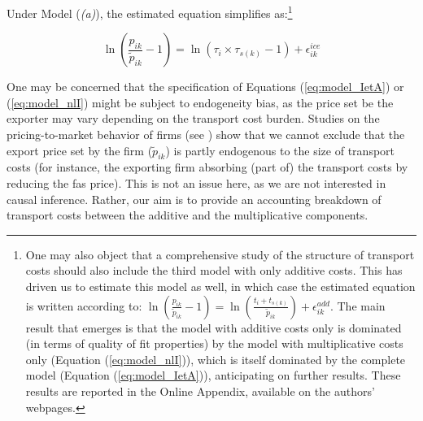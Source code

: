 \documentclass[a4paper,11pt]{article}
\begin{document}
Under Model (\textit{(a)}), the estimated equation simplifies as:\footnote{One may also object that a comprehensive study of the structure of transport costs should also include the third model with only additive costs. This has driven us to estimate this model as well, in which case the estimated equation is written according to: $\ln\left(\frac{p_{ik}}{\widetilde{p}_{ik}}-1 \right)= \ln \left(\frac{t_{i} + t_{s(k)}}{\widetilde{p}_{ik}}\right) + \epsilon^{add}_{ik}$. The main result that emerges is that the model with additive costs only is dominated (in terms of quality of fit properties) by the model with multiplicative costs only (Equation (\ref{eq:model_nlI})), which is itself dominated by the complete model (Equation (\ref{eq:model_IetA})), anticipating on further results. These results are reported in the Online Appendix, available on the authors' webpages.}

\begin{equation}
\ln\left(\frac{p_{ik}}{\widetilde{p}_{ik}}-1 \right)= \ln \left(\tau_{i}\times\tau_{s(k)}-1 \right) + \epsilon^{ice}_{ik} \label{eq:model_nlI}
\end{equation}

One may be concerned that the specification of Equations (\ref{eq:model_IetA}) or (\ref{eq:model_nlI}) might be subject to endogeneity bias, as the price set be the exporter may vary depending on the transport cost burden. Studies on the pricing-to-market behavior of firms (see \citealp{Krugman-87}) show that we cannot exclude that the export price set by the firm ($\widetilde{p}_{ik}$) is partly endogenous to the size of transport costs (for instance, the exporting firm absorbing (part of) the transport costs by reducing the fas price). This is not an issue here, as we are not interested in causal inference. Rather, our aim is to provide an accounting breakdown of transport costs between the additive and the multiplicative components.

\end{document}
